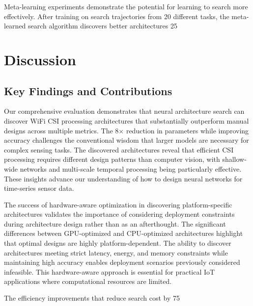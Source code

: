 \documentclass[journal]{IEEEtran}
\begin{document}
Meta-learning experiments demonstrate the potential for learning to search more effectively. After training on search trajectories from 20 different tasks, the meta-learned search algorithm discovers better architectures 25%

\section{Discussion}

\subsection{Key Findings and Contributions}

Our comprehensive evaluation demonstrates that neural architecture search can discover WiFi CSI processing architectures that substantially outperform manual designs across multiple metrics. The 8× reduction in parameters while improving accuracy challenges the conventional wisdom that larger models are necessary for complex sensing tasks. The discovered architectures reveal that efficient CSI processing requires different design patterns than computer vision, with shallow-wide networks and multi-scale temporal processing being particularly effective. These insights advance our understanding of how to design neural networks for time-series sensor data.

The success of hardware-aware optimization in discovering platform-specific architectures validates the importance of considering deployment constraints during architecture design rather than as an afterthought. The significant differences between GPU-optimized and CPU-optimized architectures highlight that optimal designs are highly platform-dependent. The ability to discover architectures meeting strict latency, energy, and memory constraints while maintaining high accuracy enables deployment scenarios previously considered infeasible. This hardware-aware approach is essential for practical IoT applications where computational resources are limited.

The efficiency improvements that reduce search cost by 75%
\end{document}
